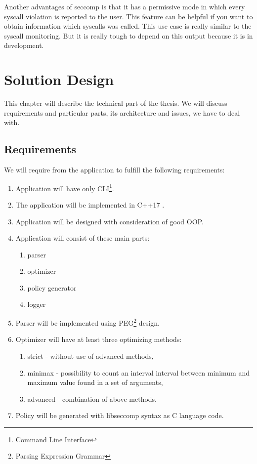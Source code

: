 Another advantages of seccomp is that it has a permissive mode in which every syscall violation is reported to the user.
This feature can be helpful if you want to obtain information which syscalls was called.
This use case is really similar to the syscall monitoring.
But it is really tough to depend on this output because it is in development.


\chapter{Solution Design}
\label{chap:design}
This chapter will describe the technical part of the thesis.
We will discuss requirements and particular parts, its architecture and issues, we have to deal with.

\section{Requirements}
\label{sec:requirements}
We will require from the application to fulfill the following requirements:
\begin{enumerate}
\item Application will have only CLI\footnote{Command Line Interface}.
\item The application will be implemented in C++17 \cite{ISO14882}.
\item Application will be designed with consideration of good OOP.
\item Application will consist of these main parts:
	\begin{enumerate}
    \item parser
    \item optimizer
    \item policy generator
    \item logger
	\end{enumerate}
\item Parser will be implemented using PEG\footnote{Parsing Expression Grammar} \cite{PEG_def} design.
\item Optimizer will have at least three optimizing methods:
	\begin{enumerate}
    \item strict - without use of advanced methods,
    \item minimax - possibility to  count an interval interval between minimum and maximum value found in a set of arguments,
    \item advanced - combination of above methods.
	\end{enumerate}
\item Policy will be generated with libseccomp \cite{libseccomp_git} syntax as C language \cite{ISO9899} code.
\end{enumerate}

